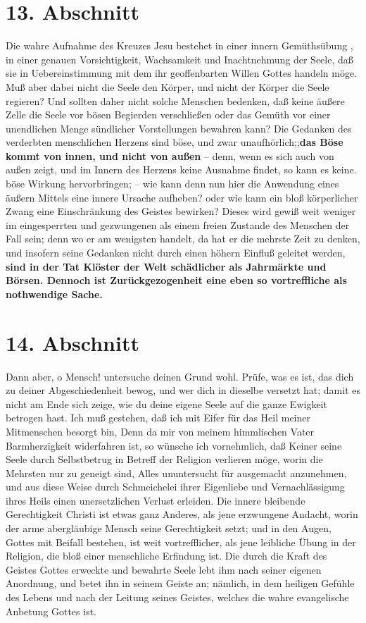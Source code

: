\section{13. Abschnitt} \label{kap5_ab13}

Die wahre Aufnahme des Kreuzes Jesu bestehet in einer innern Gemüthsübung , in
einer genauen Vorsichtigkeit, Wachsamkeit und Inachtnehmung der Seele, daß sie
in Uebereinstimmung mit dem ihr geoffenbarten Willen Gottes  handeln möge. Muß
aber dabei nicht die Seele den Körper, und nicht der Körper die Seele regieren?
Und sollten daher nicht solche Menschen bedenken, daß keine äußere Zelle die
Seele vor bösen Begierden verschließen oder das Gemüth vor einer unendlichen
Menge sündlicher Vorstellungen bewahren kann? Die Gedanken des verderbten
menschlichen Herzens sind böse, und zwar unaufhörlich;;\textbf{das Böse kommt von innen,
und nicht von außen} -- denn, wenn es sich auch von außen zeigt, und im Innern
des Herzens keine Ausnahme findet, so kann es keine. böse Wirkung hervorbringen;
-- wie kann denn nun hier die Anwendung eines äußern Mittels eine innere Ursache
aufheben? oder wie kann ein bloß körperlicher Zwang eine Einschränkung des
Geistes bewirken? Dieses wird gewiß weit weniger im eingesperrten und
gezwungenen als einem freien Zustande des Menschen der Fall sein; denn wo er am
wenigsten handelt, da hat er die mehrste Zeit zu denken, und insofern seine
Gedanken nicht durch einen höhern Einfluß geleitet werden, \textbf{sind in der Tat
Klöster der Welt schädlicher als Jahrmärkte und Börsen. Dennoch ist
Zurückgezogenheit eine eben so vortreffliche als nothwendige Sache.} 

\section{14. Abschnitt} \label{kap5_ab14}

Dann aber, o Mensch! untersuche deinen Grund wohl. Prüfe, was es ist, das dich
zu deiner Abgeschiedenheit bewog, und wer dich in dieselbe versetzt hat; damit
es nicht am Ende sich zeige, wie du deine eigene Seele auf die ganze Ewigkeit
betrogen hast. Ich muß gestehen, daß ich mit Eifer für das Heil meiner
Mitmenschen besorgt bin, Denn da mir von meinem himmlischen Vater
Barmherzigkeit widerfahren ist, so wünsche ich vornehmlich, daß Keiner seine
Seele durch Selbstbetrug in Betreff der Religion verlieren möge, worin die
Mehrsten nur zu geneigt sind, Alles ununtersucht für ausgemacht anzunehmen, und
aus diese Weise durch Schmeichelei ihrer Eigenliebe und Vernachlässigung ihres
Heils einen unersetzlichen Verlust erleiden. Die innere bleibende Gerechtigkeit
Christi ist etwas ganz Anderes, als jene erzwungene Andacht, worin der arme
abergläubige Mensch seine Gerechtigkeit setzt; und in den Augen, Gottes mit
Beifall bestehen, ist weit vortrefflicher, als jene leibliche Übung in der
Religion, die bloß einer menschliche Erfindung ist. Die durch die Kraft des
Geistes Gottes erweckte und bewahrte Seele lebt ihm nach seiner eigenen
Anordnung, und betet ihn in seinem Geiste an; nämlich, in dem heiligen Gefühle
des Lebens und nach der Leitung seines Geistes, welches die wahre evangelische
Anbetung Gottes ist.

